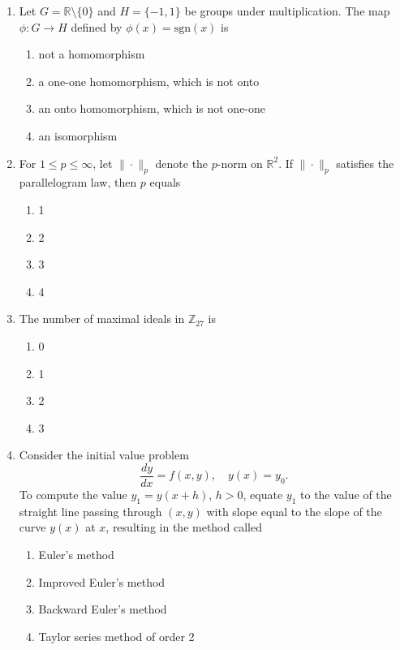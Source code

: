 \documentclass[journal]{IEEEtran}
\numberwithin{equation}{enumi}
\numberwithin{figure}{enumi}
\begin{document}
\begin{enumerate}
\item Let \(G = \mathbb{R} \setminus \{0\}\) and \(H = \{-1,1\}\) be groups under multiplication. The map \(\phi : G \to H\) defined by \(\phi(x) = \mathrm{sgn}(x)\) is
\hfill{}

\begin{enumerate}
\item not a homomorphism
\item a one-one homomorphism, which is not onto
\item an onto homomorphism, which is not one-one
\item an isomorphism
\end{enumerate}


\item For \(1 \leq p \leq \infty\), let \(\|\cdot\|_p\) denote the \(p\)-norm on \(\mathbb{R}^2\). If \(\|\cdot\|_p\) satisfies the parallelogram law, then \(p\) equals
\hfill{}
\begin{multicols}{4}
\begin{enumerate}
\item 1
\item 2
\item 3
\item 4
\end{enumerate}
\end{multicols}

\item The number of maximal ideals in \(\mathbb{Z}_{27}\) is
\hfill{}
\begin{multicols}{4}
\begin{enumerate}
\item 0
\item 1
\item 2
\item 3
\end{enumerate}
\end{multicols}

\item Consider the initial value problem
\[
\frac{dy}{dx} = f(x,y), \quad y(x) = y_0.
\]
To compute the value \(y_1 = y(x+h)\), \(h>0\), equate \(y_1\) to the value of the straight line passing through \((x,y)\) with slope equal to the slope of the curve \(y(x)\) at \(x\), resulting in the method called
\hfill{}
\begin{multicols}{2}
\begin{enumerate}
\item Euler's method
\item Improved Euler's method
\item Backward Euler's method
\item Taylor series method of order 2
\end{enumerate}
\end{multicols}




\end{enumerate}
\end{document}
